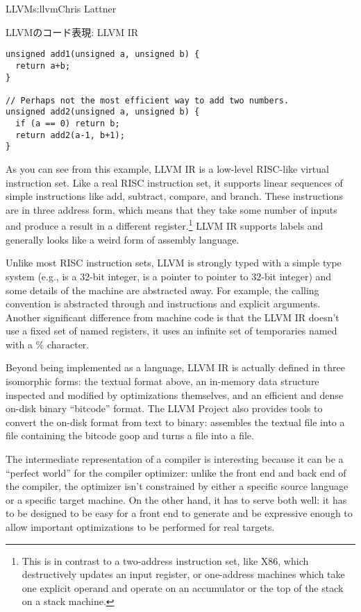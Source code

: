 \begin{aosachapter}{LLVM}{s:llvm}{Chris Lattner}
\begin{aosasect1}{LLVMのコード表現: LLVM IR}
\begin{verbatim}
unsigned add1(unsigned a, unsigned b) {
  return a+b;
}

// Perhaps not the most efficient way to add two numbers.
unsigned add2(unsigned a, unsigned b) {
  if (a == 0) return b;
  return add2(a-1, b+1);
}
\end{verbatim}

\noindent As you can see from this example, LLVM IR is a low-level RISC-like
virtual instruction set.  Like a real RISC instruction set, it
supports linear sequences of simple instructions like add, subtract,
compare, and branch.  These instructions are in three address form,
which means that they take some number of inputs and produce a result
in a different register.\footnote{This is in contrast to a two-address
instruction set, like X86, which destructively updates an input
register, or one-address machines which take one explicit operand
and operate on an accumulator or the top of the stack on a stack
machine.} LLVM IR supports labels and generally looks like a weird
form of assembly language.

Unlike most RISC instruction sets, LLVM is strongly typed with a
simple type system (e.g.,  is a 32-bit integer, 
is a pointer to pointer to 32-bit integer) and some details of the
machine are abstracted away.  For example, the calling convention is
abstracted through  and  instructions and
explicit arguments.  Another significant difference from machine code
is that the LLVM IR doesn't use a fixed set of named registers, it
uses an infinite set of temporaries named with a \% character.

Beyond being implemented as a language, LLVM IR is actually defined in
three isomorphic forms: the textual format above, an in-memory data
structure inspected and modified by optimizations themselves, and an
efficient and dense on-disk binary ``bitcode'' format.  The LLVM
Project also provides tools to convert the on-disk format from text to
binary:  assembles the textual  file into a
 file containing the bitcode goop and  turns a
 file into a  file.

The intermediate representation of a compiler is interesting because
it can be a ``perfect world'' for the compiler optimizer: unlike the
front end and back end of the compiler, the optimizer isn't constrained
by either a specific source language or a specific target machine.  On
the other hand, it has to serve both well: it has to be designed to be
easy for a front end to generate and be expressive enough to allow
important optimizations to be performed for real targets.


\end{aosasect1}
\end{aosachapter}
